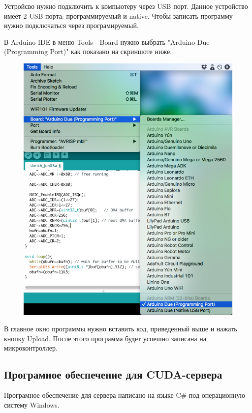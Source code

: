 \documentclass[../paper.tex]{subfiles}
\begin{document}
Устройсво нужно подключить к компьютеру через USB порт. Данное устройство имеет 2 USB порта: программируемый и native. Чтобы записать программу нужно подключаться через програмируемый.

В Arduino IDE в меню Tools - Board нужно выбрать "Arduino Due (Programming Port)" как показано на скриншоте ниже.
\begin{figure}[H]
\centering
\includegraphics[width=16cm]{images/ard-board-select.png}
\end{figure}

В главное окно программы нужно вставить код, приведенный выше и нажать кнопку Upload. После этого программа будет успешно записана на микроконтроллер.

\subsection{Програмное обеспечение для CUDA-сервера}
Програмное обеспечение для сервера написано на языке C\# под операционную систему Windows.
\end{document}
